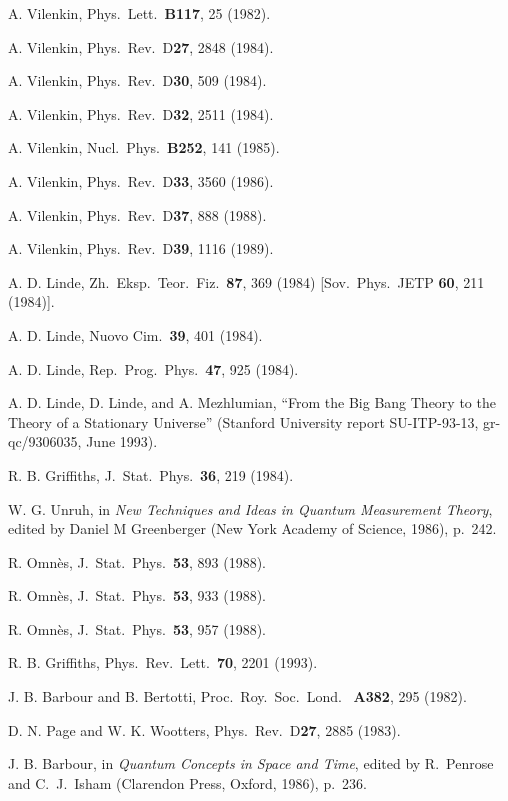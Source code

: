 \documentclass[12pt]{article}
\begin{document}
\begin{thebibliography}{999}
 A. Vilenkin, Phys.\ Lett.\ {\bf B117}, 25 (1982).

 A. Vilenkin, Phys.\ Rev.\ D{\bf 27}, 2848 (1984).

 A. Vilenkin, Phys.\ Rev.\ D{\bf 30}, 509 (1984).

 A. Vilenkin, Phys.\ Rev.\ D{\bf 32}, 2511 (1984).

 A. Vilenkin, Nucl.\ Phys.\ {\bf B252}, 141 (1985).

 A. Vilenkin, Phys.\ Rev.\ D{\bf 33}, 3560 (1986).

 A. Vilenkin, Phys.\ Rev.\ D{\bf 37}, 888 (1988).

 A. Vilenkin, Phys.\ Rev.\ D{\bf 39}, 1116 (1989).

 A. D. Linde, Zh.\ Eksp.\ Teor.\ Fiz.\ {\bf 87}, 369
(1984) [Sov.\ Phys.\ JETP {\bf 60}, 211 (1984)].

 A. D. Linde, Nuovo Cim.\ {\bf 39}, 401 (1984).

 A. D. Linde, Rep.\ Prog.\ Phys.\ {\bf 47}, 925
(1984).

 A. D. Linde, D. Linde, and A. Mezhlumian,
``From the Big Bang Theory to the Theory of a Stationary Universe''
(Stanford University report SU-ITP-93-13, gr-qc/9306035, June 1993).

 R. B. Griffiths, J.\ Stat.\ Phys.\ {\bf 36}, 219
(1984).

 W. G. Unruh, in {\em New Techniques and Ideas
in Quantum Measurement Theory}, edited by Daniel M Greenberger
(New York Academy of Science, 1986), p.~242.

 R. Omn\`{e}s, J.\ Stat.\ Phys.\ {\bf 53}, 893 (1988).

 R. Omn\`{e}s, J.\ Stat.\ Phys.\ {\bf 53}, 933 (1988).

 R. Omn\`{e}s, J.\ Stat.\ Phys.\ {\bf 53}, 957 (1988).

 R. B. Griffiths, Phys.\ Rev.\ Lett.\ {\bf 70}, 2201
(1993).

 J. B. Barbour and B. Bertotti, Proc.\ Roy.\ Soc.\ Lond.\
{\bf
A382}, 295 (1982).

 D. N. Page and W. K. Wootters, Phys.\ Rev.\ D{\bf 27},
2885 (1983).

 J. B. Barbour, in {\em Quantum Concepts in Space and
Time},
edited by
R.~Penrose and C.~J.~Isham (Clarendon Press, Oxford, 1986), p.~236.


\end{thebibliography}
\end{document}
